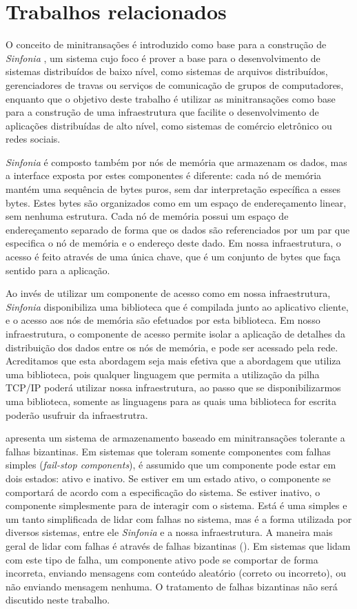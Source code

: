 \documentclass[11pt,twoside,a4paper]{book}
\begin{document}
\section{Trabalhos relacionados}
\label{sec:trabalhos_relacionados}
O conceito de minitransações é introduzido como base para a construção de \emph{Sinfonia} \cite{sinfonia}, um sistema cujo foco é prover a base para o desenvolvimento de sistemas distribuídos de baixo nível, como sistemas de arquivos distribuídos, gerenciadores de travas ou serviços de comunicação de grupos de computadores, enquanto que o objetivo deste trabalho é utilizar as minitransações como base para a construção de uma infraestrutura que facilite o desenvolvimento de aplicações distribuídas de alto nível, como sistemas de comércio eletrônico ou redes sociais. 

\emph{Sinfonia} é composto também por nós de memória que armazenam os dados, mas a interface exposta por estes componentes é diferente: cada nó de memória mantém uma sequência de bytes puros, sem dar interpretação específica a esses bytes. Estes bytes são organizados como em um espaço de endereçamento linear, sem nenhuma estrutura. Cada nó de memória possui um espaço de endereçamento separado de forma que os dados são referenciados por um par que especifica o nó de memória e o endereço deste dado. Em nossa infraestrutura, o acesso é feito através de uma única chave, que é um conjunto de bytes que faça sentido para a aplicação.

Ao invés de utilizar um componente de acesso como em nossa infraestrutura, \emph{Sinfonia} disponibiliza uma biblioteca que é compilada junto ao aplicativo cliente, e o acesso aos nós de memória são efetuados por esta biblioteca. Em nosso infraestrutura, o componente de acesso permite isolar a aplicação de detalhes da distribuição dos dados entre os nós de memória, e pode ser acessado pela rede. Acreditamos que esta abordagem seja mais efetiva que a abordagem que utiliza uma biblioteca, pois qualquer linguagem que permita a utilização da pilha TCP/IP poderá utilizar nossa infraestrutura, ao passo que se disponibilizarmos uma biblioteca, somente as linguagens para as quais uma biblioteca for escrita poderão usufruir da infraestrutra.

\cite{padilha} apresenta um sistema de armazenamento baseado em minitransações tolerante a falhas bizantinas. Em sistemas que toleram somente componentes com falhas simples (\emph{fail-stop components}), é assumido que um componente pode estar em dois estados: ativo e inativo. Se estiver em um estado ativo, o componente se comportará de acordo com a especificação do sistema. Se estiver inativo, o componente simplesmente para de interagir com o sistema. Está é uma simples e um tanto simplificada de lidar com falhas no sistema, mas é a forma utilizada por diversos sistemas, entre ele \emph{Sinfonia} e a nossa infraestrutura. A maneira mais geral de lidar com falhas é através de falhas bizantinas (\cite{byzantine}). Em sistemas que lidam com este tipo de falha, um componente ativo pode se comportar de forma incorreta, enviando mensagens com conteúdo aleatório (correto ou incorreto), ou não enviando mensagem nenhuma. O tratamento de falhas bizantinas não será discutido neste trabalho.
\end{document}
